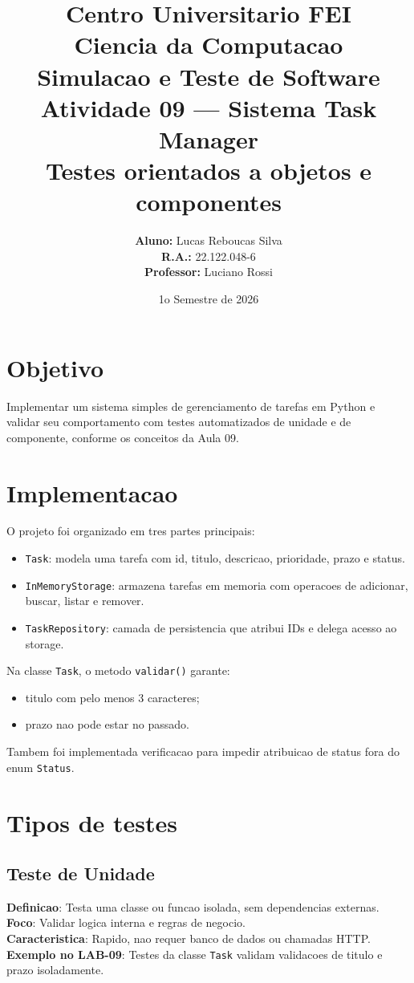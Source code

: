 \documentclass[11pt,a4paper]{article}
\title{
    {\Large \textbf{Centro Universitario FEI}}\\
    \vspace{0.3cm}
    {\large Ciencia da Computacao}\\[0.8cm]
    {\LARGE \textbf{Simulacao e Teste de Software}}\\[0.3cm]
    {\Large Atividade 09 --- Sistema Task Manager}\\[0.8cm]
    {\large \textbf{Testes orientados a objetos e componentes}}
}
\author{
    \textbf{Aluno:} Lucas Reboucas Silva\\
    \textbf{R.A.:} 22.122.048-6\\[0.4cm]
    \textbf{Professor:} Luciano Rossi
}
\date{1o Semestre de 2026}
\begin{document}
\maketitle
\thispagestyle{empty}
\newpage
\setcounter{page}{1}

\section{Objetivo}
Implementar um sistema simples de gerenciamento de tarefas em Python e validar seu comportamento com testes automatizados de unidade e de componente, conforme os conceitos da Aula 09.

\section{Implementacao}
O projeto foi organizado em tres partes principais:
\begin{itemize}
    \item \texttt{Task}: modela uma tarefa com id, titulo, descricao, prioridade, prazo e status.
    \item \texttt{InMemoryStorage}: armazena tarefas em memoria com operacoes de adicionar, buscar, listar e remover.
    \item \texttt{TaskRepository}: camada de persistencia que atribui IDs e delega acesso ao storage.
\end{itemize}

Na classe \texttt{Task}, o metodo \texttt{validar()} garante:
\begin{itemize}
    \item titulo com pelo menos 3 caracteres;
    \item prazo nao pode estar no passado.
\end{itemize}
Tambem foi implementada verificacao para impedir atribuicao de status fora do enum \texttt{Status}.

\section{Tipos de testes}

\subsection{Teste de Unidade}
\textbf{Definicao}: Testa uma classe ou funcao isolada, sem dependencias externas. \\
\textbf{Foco}: Validar logica interna e regras de negocio. \\
\textbf{Caracteristica}: Rapido, nao requer banco de dados ou chamadas HTTP. \\
\textbf{Exemplo no LAB-09}: Testes da classe \texttt{Task} validam validacoes de titulo e prazo isoladamente.
\end{document}
